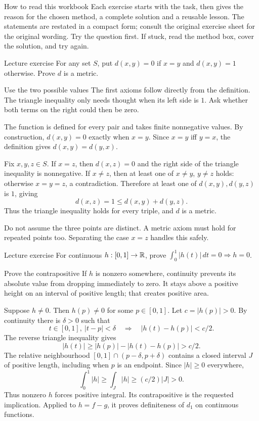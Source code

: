 \begin{note}{How to read this workbook}
Each exercise starts with the task, then gives the reason for the chosen method, a complete solution and a reusable lesson. The statements are restated in a compact form; consult the original exercise sheet for the original wording. Try the question first. If stuck, read the method box, cover the solution, and try again.
\end{note}
\begin{exam}{Lecture exercise}
For any set $S$, put $d(x,y)=0$ if $x=y$ and $d(x,y)=1$ otherwise. Prove $d$ is a metric.
\end{exam}
\begin{method}{Use the two possible values}
The first axioms follow directly from the definition. The triangle inequality only needs thought when its left side is $1$. Ask whether both terms on the right could then be zero.
\end{method}
\begin{answer}
The function is defined for every pair and takes finite nonnegative values. By construction, $d(x,y)=0$ exactly when $x=y$. Since $x=y$ iff $y=x$, the definition gives $d(x,y)=d(y,x)$.

Fix $x,y,z\in S$. If $x=z$, then $d(x,z)=0$ and the right side of the triangle inequality is nonnegative. If $x\ne z$, then at least one of $x\ne y$, $y\ne z$ holds: otherwise $x=y=z$, a contradiction. Therefore at least one of $d(x,y),d(y,z)$ is $1$, giving
\[d(x,z)=1\le d(x,y)+d(y,z).\]
Thus the triangle inequality holds for every triple, and $d$ is a metric.
\end{answer}
\begin{tip}
Do not assume the three points are distinct. A metric axiom must hold for repeated points too. Separating the case $x=z$ handles this safely.
\end{tip}
\begin{exam}{Lecture exercise}
For continuous $h:[0,1]\to\mathbb R$, prove $\int_0^1|h(t)|\,dt=0\Rightarrow h=0$.
\end{exam}
\begin{method}{Prove the contrapositive}
If $h$ is nonzero somewhere, continuity prevents its absolute value from dropping immediately to zero. It stays above a positive height on an interval of positive length; that creates positive area.
\end{method}
\begin{answer}
Suppose $h\ne0$. Then $h(p)\ne0$ for some $p\in[0,1]$. Let $c=|h(p)|>0$. By continuity there is $\delta>0$ such that
\[t\in[0,1],\ |t-p|<\delta\quad\Rightarrow\quad |h(t)-h(p)|<c/2.\]
The reverse triangle inequality gives
\[|h(t)|\ge |h(p)|-|h(t)-h(p)|>c/2.\]
The relative neighbourhood $[0,1]\cap(p-\delta,p+\delta)$ contains a closed interval $J$ of positive length, including when $p$ is an endpoint. Since $|h|\ge0$ everywhere,
\[\int_0^1|h|\ge\int_J|h|\ge(c/2)|J|>0.\]
Thus nonzero $h$ forces positive integral. Its contrapositive is the requested implication. Applied to $h=f-g$, it proves definiteness of $d_1$ on continuous functions.
\end{answer}
